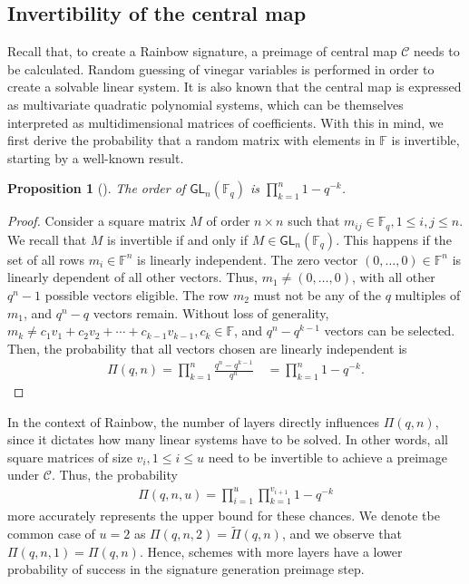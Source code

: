 \documentclass[12pt, a4paper, oneside]{memoir}
\newtheorem{proposition}[theorem]{Proposition}
\theoremstyle{definition}
\begin{document}
\subsection{Invertibility of the central map}\label{subsec:invert}

Recall that, to create a Rainbow signature, a preimage of central map $\mathcal{C}$ needs to be calculated. Random guessing of vinegar variables is performed in order to create a solvable linear system. It is also known that the central map is expressed as multivariate quadratic polynomial systems, which can be themselves interpreted as multidimensional matrices of coefficients. With this in mind, we first derive the probability that a random matrix with elements in $\mathbb{F}$ is invertible, starting by a well-known result.

\begin{proposition}[{\cite[Remark 13.2.14]{Mullen:2013}}]
  The order of $\mathsf{GL}_{n}(\mathbb{F}_{q})$ is $\prod_{k = 1}^{n} 1 - q^{-k}$.
\end{proposition}
\begin{proof}
  Consider a square matrix $M$ of order $n \times n$ such that $m_{ij} \in \mathbb{F}_{q}, 1 \leq i, j \leq n$. We recall that $M$ is invertible if and only if $M \in \mathsf{GL}_{n}(\mathbb{F}_{q})$. This happens if the set of all rows $m_{i} \in \mathbb{F}^{n}$ is linearly independent. The zero vector $(0, \dots, 0) \in \mathbb{F}^{n}$ is linearly dependent of all other vectors. Thus, $m_{1} \neq (0, \dots, 0)$, with all other $q^{n} - 1$ possible vectors eligible. The row $m_{2}$ must not be any of the $q$ multiples of $m_{1}$, and $q^{n} - q$ vectors remain. Without loss of generality, $m_{k} \ne c_{1} v_{1} + c_{2} v_{2} + \cdots + c_{k - 1} v_{k - 1}, c_{k} \in \mathbb{F}$, and $q^{n} - q^{k - 1}$ vectors can be selected. Then, the probability that all vectors chosen are linearly independent is
\begin{align}
  \Pi(q, n) = \prod_{k = 1}^{n} \frac{q^{n} - q^{k - 1}}{q^{n}} \quad
    = \prod_{k = 1}^{n} 1 - q^{-k}.
\end{align}
\end{proof}

In the context of Rainbow, the number of layers directly influences $\Pi(q, n)$, since it dictates how many linear systems have to be solved. In other words, all square matrices of size $v_{i}, 1 \leq i \leq u$ need to be invertible to achieve a preimage under $\mathcal{C}$. Thus, the probability
\begin{align}
  \Pi(q, n, u) = \prod_{i = 1}^{u} \prod_{k = 1}^{v_{i + 1}} 1 - q^{-k}
\end{align}
more accurately represents the upper bound for these chances. We denote tbe common case of $u = 2$ as $\Pi(q, n, 2) = \widetilde{\Pi}(q, n)$, and we observe that $\Pi(q, n, 1) = \Pi(q, n)$. Hence, schemes with more layers have a lower probability of success in the signature generation preimage step.
\end{document}
